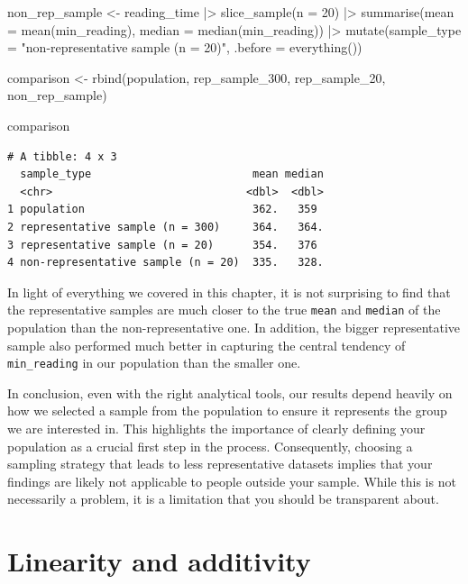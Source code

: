 \documentclass[
  letterpaper,
]{krantz}
\makeatletter
\newenvironment{Shaded}{\begin{snugshade}}{\end{snugshade}}
\newcommand{\AttributeTok}[1]{\textcolor[rgb]{0.40,0.45,0.13}{#1}}
\newcommand{\DecValTok}[1]{\textcolor[rgb]{0.68,0.00,0.00}{#1}}
\newcommand{\FunctionTok}[1]{\textcolor[rgb]{0.28,0.35,0.67}{#1}}
\newcommand{\NormalTok}[1]{\textcolor[rgb]{0.00,0.23,0.31}{#1}}
\newcommand{\OtherTok}[1]{\textcolor[rgb]{0.00,0.23,0.31}{#1}}
\newcommand{\SpecialCharTok}[1]{\textcolor[rgb]{0.37,0.37,0.37}{#1}}
\newcommand{\StringTok}[1]{\textcolor[rgb]{0.13,0.47,0.30}{#1}}
\newenvironment{kframe}{%
\medskip{}
\setlength{\fboxsep}{.8em}
 \def\at@end@of@kframe{}%
 \ifinner\ifhmode%
  \def\at@end@of@kframe{\end{minipage}}%
  \begin{minipage}{\columnwidth}%
 \fi\fi%
 \def\FrameCommand##1{\hskip\@totalleftmargin \hskip-\fboxsep
 \colorbox{shadecolor}{##1}\hskip-\fboxsep
     \hskip-\linewidth \hskip-\@totalleftmargin \hskip\columnwidth}%
 \MakeFramed {\advance\hsize-\width
   \@totalleftmargin\z@ \linewidth\hsize
   \@setminipage}}%
 {\par\unskip\endMakeFramed%
 \at@end@of@kframe}
\renewenvironment{Shaded}{\begin{kframe}}{\end{kframe}}
\makeatother
\begin{document}
\begin{Shaded}
\begin{Highlighting}[]
\NormalTok{non\_rep\_sample }\OtherTok{\textless{}{-}}
\NormalTok{  reading\_time }\SpecialCharTok{|\textgreater{}}
  \FunctionTok{slice\_sample}\NormalTok{(}\AttributeTok{n =} \DecValTok{20}\NormalTok{) }\SpecialCharTok{|\textgreater{}}
  \FunctionTok{summarise}\NormalTok{(}\AttributeTok{mean =} \FunctionTok{mean}\NormalTok{(min\_reading),}
            \AttributeTok{median =} \FunctionTok{median}\NormalTok{(min\_reading)) }\SpecialCharTok{|\textgreater{}}
  \FunctionTok{mutate}\NormalTok{(}\AttributeTok{sample\_type =} \StringTok{"non{-}representative sample (n = 20)"}\NormalTok{, }\AttributeTok{.before =} \FunctionTok{everything}\NormalTok{())}

\NormalTok{comparison }\OtherTok{\textless{}{-}} \FunctionTok{rbind}\NormalTok{(population, rep\_sample\_300, rep\_sample\_20, non\_rep\_sample)}

\NormalTok{comparison}
\end{Highlighting}
\end{Shaded}

\begin{verbatim}
# A tibble: 4 x 3
  sample_type                         mean median
  <chr>                              <dbl>  <dbl>
1 population                          362.   359 
2 representative sample (n = 300)     364.   364.
3 representative sample (n = 20)      354.   376 
4 non-representative sample (n = 20)  335.   328.
\end{verbatim}

In light of everything we covered in this chapter, it is not surprising
to find that the representative samples are much closer to the true
\texttt{mean} and \texttt{median} of the population than the
non-representative one. In addition, the bigger representative sample
also performed much better in capturing the central tendency of
\texttt{min\_reading} in our population than the smaller one.

In conclusion, even with the right analytical tools, our results depend
heavily on how we selected a sample from the population to ensure it
represents the group we are interested in. This highlights the
importance of clearly defining your population as a crucial first step
in the process. Consequently, choosing a sampling strategy that leads to
less representative datasets implies that your findings are likely not
applicable to people outside your sample. While this is not necessarily
a problem, it is a limitation that you should be transparent about.

\section{Linearity and additivity}\label{sec-additivity-and-linearity}
\end{document}
